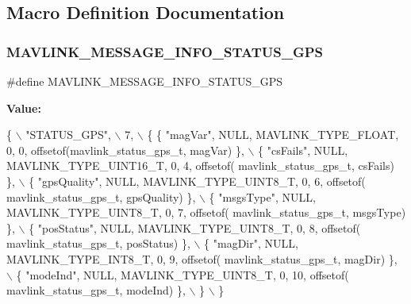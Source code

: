 \subsection{Macro Definition Documentation}
\mbox{\label{mavlink__msg__status__gps_8h_ab359a6d9580fd8f95a78111ed3e5c941}} 
\subsubsection{M\+A\+V\+L\+I\+N\+K\+\_\+\+M\+E\+S\+S\+A\+G\+E\+\_\+\+I\+N\+F\+O\+\_\+\+S\+T\+A\+T\+U\+S\+\_\+\+G\+PS}
{\footnotesize\ttfamily \#define M\+A\+V\+L\+I\+N\+K\+\_\+\+M\+E\+S\+S\+A\+G\+E\+\_\+\+I\+N\+F\+O\+\_\+\+S\+T\+A\+T\+U\+S\+\_\+\+G\+PS}

{\bfseries Value\+:}
\begin{DoxyCode}
\{ \(\backslash\)
    \textcolor{stringliteral}{"STATUS\_GPS"}, \(\backslash\)
    7, \(\backslash\)
    \{  \{ \textcolor{stringliteral}{"magVar"}, NULL, MAVLINK_TYPE_FLOAT, 0, 0, offsetof(mavlink_status_gps_t, magVar) \}, \(\backslash\)
         \{ \textcolor{stringliteral}{"csFails"}, NULL, MAVLINK_TYPE_UINT16_T, 0, 4, offsetof(
      mavlink_status_gps_t, csFails) \}, \(\backslash\)
         \{ \textcolor{stringliteral}{"gpsQuality"}, NULL, MAVLINK_TYPE_UINT8_T, 0, 6, offsetof(
      mavlink_status_gps_t, gpsQuality) \}, \(\backslash\)
         \{ \textcolor{stringliteral}{"msgsType"}, NULL, MAVLINK_TYPE_UINT8_T, 0, 7, offsetof(
      mavlink_status_gps_t, msgsType) \}, \(\backslash\)
         \{ \textcolor{stringliteral}{"posStatus"}, NULL, MAVLINK_TYPE_UINT8_T, 0, 8, offsetof(
      mavlink_status_gps_t, posStatus) \}, \(\backslash\)
         \{ \textcolor{stringliteral}{"magDir"}, NULL, MAVLINK_TYPE_INT8_T, 0, 9, offsetof(
      mavlink_status_gps_t, magDir) \}, \(\backslash\)
         \{ \textcolor{stringliteral}{"modeInd"}, NULL, MAVLINK_TYPE_UINT8_T, 0, 10, offsetof(
      mavlink_status_gps_t, modeInd) \}, \(\backslash\)
         \} \(\backslash\)
\}
\end{DoxyCode}
\mbox{\label{mavlink__msg__status__gps_8h_afb62406277fdbcb2b8d3e9fb5040f23a}} 
